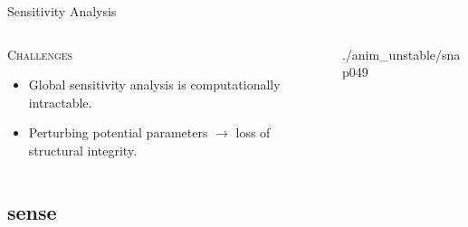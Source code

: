\documentclass[xcolor={x11names,table},compress,svgnames,mathserif]{beamer}
\renewcommand{\(}{\begin{columns}}
\renewcommand{\)}{\end{columns}}
\newcommand{\<}[1]{\begin{column}{#1}}
\renewcommand{\>}{\end{column}}
\newcommand*\Myitem{%
  \item[\color{DeepSkyBlue4}\scalebox{0.9}{\ding{42}}]}
\begin{document}
\begin{frame}{Sensitivity Analysis}

\begin{columns}
\begin{column}{0.55\textwidth}
\textsc{Challenges}

\vspace{2mm}
\begin{itemize}

\Myitem Global sensitivity analysis is {\color{pigment}computationally intractable}.
\vspace{2mm}
\Myitem Perturbing potential parameters $\rightarrow$ loss of {\color{pigment}structural integrity}. 
\end{itemize}
\end{column}

\begin{column}{0.45\textwidth}
\begin{center}
       {./anim_unstable/snap}{0}{49}

  \end{center}
  
 \end{column}
\end{columns}

\end{frame}


\subsection{sense}
\end{document}
